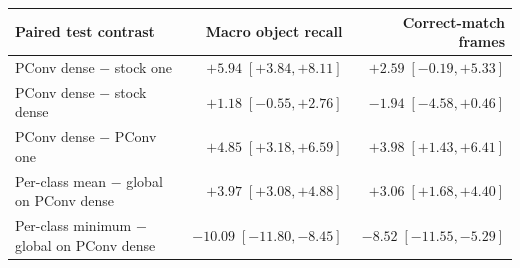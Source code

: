 \begin{tabular}{lrr}\hline
Paired test contrast & Macro object recall & Correct-match frames \\ \hline
PConv dense $-$ stock one & \(+5.94\;[+3.84,+8.11]\) & \(+2.59\;[-0.19,+5.33]\) \\
PConv dense $-$ stock dense & \(+1.18\;[-0.55,+2.76]\) & \(-1.94\;[-4.58,+0.46]\) \\
PConv dense $-$ PConv one & \(+4.85\;[+3.18,+6.59]\) & \(+3.98\;[+1.43,+6.41]\) \\
Per-class mean $-$ global on PConv dense & \(+3.97\;[+3.08,+4.88]\) & \(+3.06\;[+1.68,+4.40]\) \\
Per-class minimum $-$ global on PConv dense & \(-10.09\;[-11.80,-8.45]\) & \(-8.52\;[-11.55,-5.29]\) \\
\hline\end{tabular}
